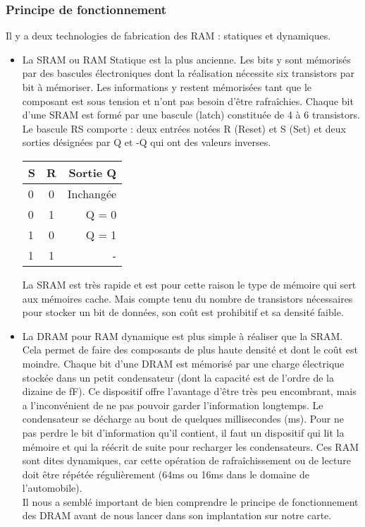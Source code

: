 \subsubsection{Principe de fonctionnement}
Il y a deux technologies de fabrication des RAM : statiques et dynamiques. \\
\begin{itemize}
	\item La SRAM ou RAM Statique est la plus ancienne. 
	      Les bits y sont mémorisés par des bascules électroniques dont la réalisation nécessite six transistors par bit à mémoriser. 
	      Les informations y restent mémorisées tant que le composant est sous tension et n'ont pas besoin d'être rafraîchies.
	      Chaque bit d'une SRAM est formé par une bascule (latch) constituée de 4 à 6 transistors. \\
	      Le bascule RS comporte : deux entrées notées R (Reset) et S (Set) et deux sorties désignées par Q et -Q qui ont des valeurs inverses.
	      	                  
	      \begin{center}
	      	\begin{tabular}{|l|c|r|}
	      		\hline
	      		S & R & Sortie Q   \\
	      		\hline
	      		0 & 0 & Inchangée \\
	      		\hline
	      		0 & 1 & Q = 0      \\
	      		\hline
	      		1 & 0 & Q = 1      \\
	      		\hline
	      		1 & 1 & -          \\
	      		\hline
	      	\end{tabular}
	      \end{center}
	      	      
	      La SRAM est très rapide et est pour cette raison le type de mémoire qui sert aux mémoires cache.
	      Mais compte tenu du nombre de transistors nécessaires pour stocker un bit de données, son coût est prohibitif et sa densité faible. \\
	\item La DRAM pour RAM dynamique est plus simple à réaliser que la SRAM. 
	      Cela permet de faire des composants de plus haute densité et dont le coût est moindre. 
	      Chaque bit d'une DRAM est mémorisé par une charge électrique stockée dans un petit condensateur (dont la capacité est de l'ordre de la dizaine de fF). 
	      Ce dispositif offre l'avantage d'être très peu encombrant, mais a l'inconvénient de ne pas pouvoir garder l'information longtemps. 
	      Le condensateur se décharge au bout de quelques millisecondes (ms). 
	      Pour ne pas perdre le bit d'information qu'il contient, il faut un dispositif qui lit la mémoire et qui la réécrit de suite pour recharger les condensateurs. 
	      Ces RAM sont dites dynamiques, car cette opération de rafraîchissement ou de lecture doit être répétée régulièrement (64ms ou 16ms dans le domaine de l'automobile). \\
	      Il nous a semblé important de bien comprendre le principe de fonctionnement des DRAM avant de nous lancer dans son implantation sur notre carte. \\
	      	                  

\end{itemize}

